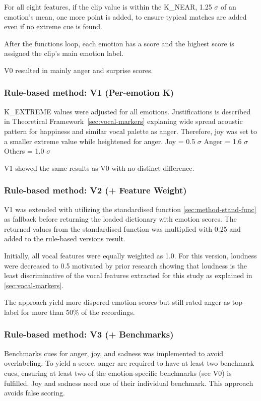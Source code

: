 For all eight features, if the clip value is within the K\_NEAR, 1.25 $\sigma$ of an emotion's mean, one more point is added, to ensure typical matches are added even if no extreme cue is found. 

After the functions loop, each emotion has a score and the highest score is assigned the clip's main emotion label. 

V0 resulted in mainly anger and surprise scores. 
\subsubsection{Rule-based method: V1 (Per-emotion K)}
K\_EXTREME values were adjusted for all emotions. Justifications is described in Theoretical Framework~\ref{sec:vocal-markers} explaning wide spread acoustic pattern for happiness and similar vocal palette as anger. 
Therefore, joy was set to a smaller extreme value while heightened for anger. 
Joy = 0.5 $\sigma$ 
Anger = 1.6 $\sigma$ 
Others = 1.0 $\sigma$

\medskip
V1 showed the same results as V0 with no distinct difference. 

\subsubsection{Rule-based method: V2 (+ Feature Weight)}
V1 was extended with utilizing the standardised function \ref{sec:method-stand-func} as fallback before returning the loaded dictionary with emotion scores. 
The returned values from the standardised function was multiplied with 0.25 and added to the rule-based versions result.

Initially, all vocal features were equally weighted as 1.0. For this version, loudness were decreased to 0.5 motivated by prior research showing that loudness is the 
least discriminative of the vocal features extracted for this study as explained in \ref{sec:vocal-markers}. 

The approach yield more dispered emotion scores but still rated anger as top-label for more than 50\% of the recordings. 

\subsubsection{Rule-based method: V3 (+ Benchmarks)}
Benchmarks cues for anger, joy, and sadness was implemented to avoid overlabeling. To yield a score, anger are required to have at least two benchmark cues, ensuring at least two of the emotion-specific benchmarks (see V0) is fulfilled.  
Joy and sadness need one of their individual benchmark. This approach avoids false scoring. 

